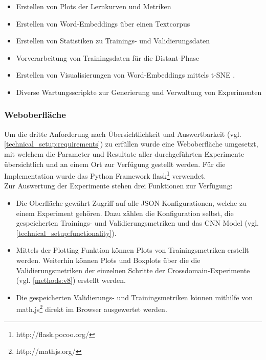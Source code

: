 \begin{itemize}[noitemsep]
	\item Erstellen von Plots der Lernkurven und Metriken
	\item Erstellen von Word-Embeddings über einen Textcorpus
	\item Erstellen von Statistiken zu Trainings- und Validierungsdaten
	\item Vorverarbeitung von Trainingsdaten für die Distant-Phase
	\item Erstellen von Visualisierungen von Word-Embeddings mittels t-SNE \cite{maaten2008visualizing}.
	\item Diverse Wartungsscripkte zur Generierung und Verwaltung von Experimenten
\end{itemize}

\subsubsection{Weboberfläche}
Um die dritte Anforderung nach Übersichtlichkeit und Auswertbarkeit (vgl. \ref{technical_setup:requirements}) zu erfüllen wurde eine Weboberfläche umgesetzt, mit welchem die Parameter und Resultate aller durchgeführten Experimente übersichtlich und an einem Ort zur Verfügung gestellt werden. Für die Implementation wurde das Python Framework flask\footnote{http://flask.pocoo.org/} verwendet.\\
Zur Auswertung der Experimente stehen drei Funktionen zur Verfügung:
\begin{itemize}
	\item Die Oberfläche gewährt Zugriff auf alle JSON Konfigurationen, welche zu einem Experiment gehören. Dazu zählen die Konfiguration selbst, die gespeicherten Trainings- und Validierungsmetriken und das CNN Model (vgl. \ref{technical_setup:functionality}).
	\item Mittels der Plotting Funktion können Plots von Trainingsmetriken erstellt werden. Weiterhin können Plots und Boxplots über die die Validierungsmetriken der einzelnen Schritte der Crossdomain-Experimente (vgl. \ref{methods:v8}) erstellt werden.
	\item Die gespeicherten Validierungs- und Trainingsmetriken können mithilfe von math.js\footnote{http://mathjs.org/} direkt im Browser ausgewertet werden.
\end{itemize}
